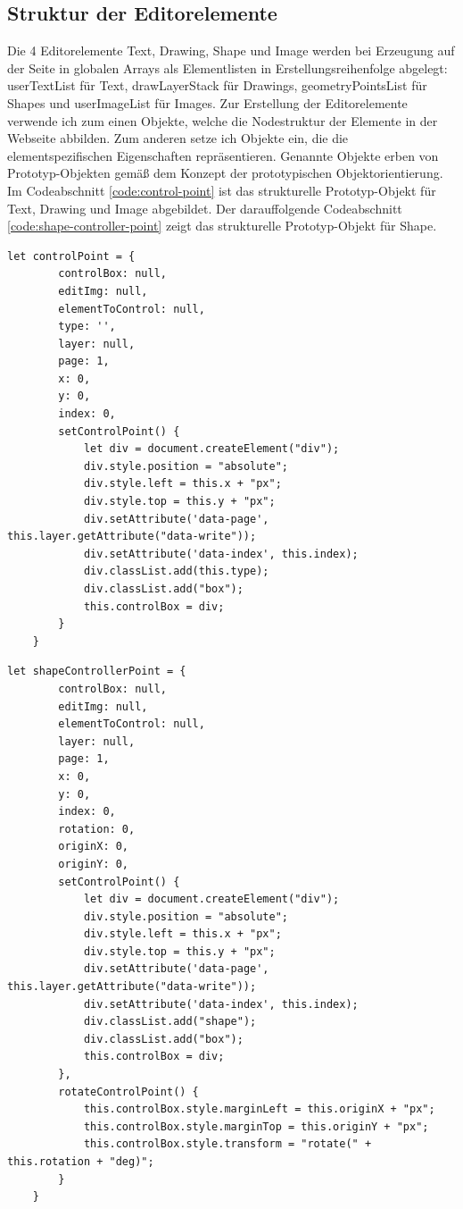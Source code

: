 \subsection{Struktur der Editorelemente}
Die 4 Editorelemente Text, Drawing, Shape und Image werden bei Erzeugung auf der Seite in globalen Arrays als Elementlisten in Erstellungsreihenfolge abgelegt: userTextList für Text, drawLayerStack für Drawings, geometryPointsList für Shapes und userImageList für Images. Zur Erstellung der Editorelemente verwende ich zum einen Objekte, welche die Nodestruktur der Elemente in der Webseite abbilden. Zum anderen setze ich Objekte ein, die die elementspezifischen Eigenschaften repräsentieren. Genannte Objekte erben von Prototyp-Objekten gemäß dem Konzept der prototypischen Objektorientierung. Im Codeabschnitt \ref{code:control-point} ist das strukturelle Prototyp-Objekt für Text, Drawing und Image abgebildet. Der darauffolgende Codeabschnitt \ref{code:shape-controller-point} zeigt das strukturelle Prototyp-Objekt für Shape.

\begin{lstlisting}[style=ES6, caption={Prototyp-Objekt für die Node-Struktur von Text, Drawing und Image}, label=code:control-point, breaklines=true]
	let controlPoint = {
		controlBox: null,
		editImg: null,
		elementToControl: null,
		type: '',
		layer: null,
		page: 1,
		x: 0,
		y: 0,
		index: 0,
		setControlPoint() {
			let div = document.createElement("div");
			div.style.position = "absolute";
			div.style.left = this.x + "px";
			div.style.top = this.y + "px";
			div.setAttribute('data-page', this.layer.getAttribute("data-write"));
			div.setAttribute('data-index', this.index);
			div.classList.add(this.type);
			div.classList.add("box");
			this.controlBox = div;
		}
	}
\end{lstlisting}

\begin{lstlisting}[style=ES6, caption={Prototyp-Objekt für die Node-Struktur von Shape}, label=code:shape-controller-point, breaklines=true]
	let shapeControllerPoint = {
		controlBox: null,
		editImg: null,
		elementToControl: null,
		layer: null,
		page: 1, 
		x: 0,
		y: 0,
		index: 0, 
		rotation: 0,
		originX: 0,
		originY: 0,
		setControlPoint() {
			let div = document.createElement("div");
			div.style.position = "absolute";
			div.style.left = this.x + "px";
			div.style.top = this.y + "px";
			div.setAttribute('data-page', this.layer.getAttribute("data-write"));
			div.setAttribute('data-index', this.index);
			div.classList.add("shape");
			div.classList.add("box");
			this.controlBox = div;
		},
		rotateControlPoint() {
			this.controlBox.style.marginLeft = this.originX + "px";
			this.controlBox.style.marginTop = this.originY + "px";
			this.controlBox.style.transform = "rotate(" + this.rotation + "deg)";
		}
	}
\end{lstlisting}  

